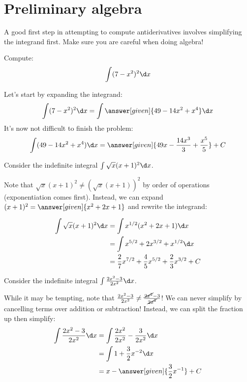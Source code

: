 \documentclass[nooutcomes]{ximera}
\begin{document}
\section{Preliminary algebra}

A good first step in attempting to compute antiderivatives involves simplifying the integrand first.  Make sure you are careful when doing algebra!



\begin{example}
  Compute:
  \[
  \int (7-x^2)^2 \d x
  \]
  \begin{explanation}
    Let's start by expanding the integrand:
    \[
    \int (7-x^2)^2 \d x  = \int \answer[given]{49 - 14x^2 + x^4} \d x
    \]
    It's now not difficult to finish the problem:
    \[
    \int (49 - 14x^2 + x^4) \d x = \answer[given]{49x - \frac{14 x^3}{3} + \frac{x^5}{5}} + C
    \]
  \end{explanation}
\end{example}

\begin{example}
Consider the indefinite integral $\int \sqrt{x}(x+1)^2 \d x$.  

Note that $\sqrt{x}(x+1)^2 \neq (\sqrt{x}(x+1))^2$ by order of operations (exponentiation comes first). Instead, we can expand $(x+1)^2 = \answer[given]{x^2+2x+1}$ and rewrite the integrand:

\begin{align*}
\int \sqrt{x}(x+1)^2 \d x &= \int x^{1/2} (x^2+2x+1) \d x \\
&=  \int x^{5/2}+2x^{3/2}+x^{1/2} \d x \\
&= \frac{2}{7} x^{7/2}+\frac{4}{5}x^{5/2}+\frac{2}{3}x^{3/2}+C
\end{align*}

\end{example}
 
\begin{example}
Consider the indefinite integral $\int \frac{2x^2-3}{2x^2} \d x$.  

While it may be tempting, note that $\frac{2x^2-3}{2x^2} \neq \frac{\cancel{2x^2}-3}{\cancel{2x^2}}$!  We can never simplify by cancelling terms over addition or subtraction!  Instead, we can split the fraction up then simplify: 
\begin{align*}
\int \frac{2x^2-3}{2x^2} \d x &=\int \frac{2x^2}{2x^2}-\frac{3}{2x^2} \d x \\
&=  \int 1+\frac{3}{2}x^{-2} \d x \\
&= x- \answer[given]{\frac{3}{2}x^{-1}}+C
\end{align*}

\end{example}
\end{document}
